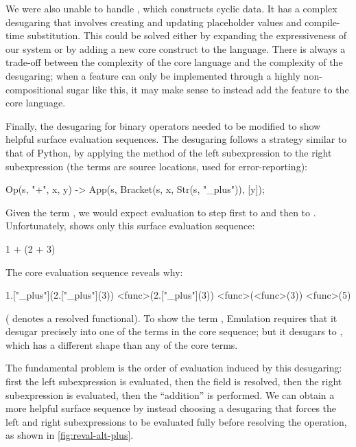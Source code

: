 We were also unable to handle , which constructs cyclic data.
It has a
complex desugaring that involves creating and updating placeholder values
and compile-time substitution. This could be solved either by expanding
the expressiveness of our system or by adding a new core construct to the
language. There is always a trade-off between the complexity of the core
language and the complexity of the desugaring; when a feature can only be
implemented through a highly non-compositional sugar like this, it may
make sense to instead add the feature to the core language.

Finally, the desugaring for binary operators needed to be modified to show helpful
surface evaluation sequences. The desugaring follows
a strategy similar to that of Python, by applying the  method
of the left subexpression to the right subexpression (the  terms
are source locations, used for error-reporting):
\begin{codeex}
  Op(s, "+", x, y)  ->
    App(s, Bracket(s, x, Str(s, "_plus")), [y]);
\end{codeex}
Given the term , we would expect evaluation to step
first to  and then to . Unfortunately, {\Resugarer}
shows only this surface evaluation sequence:
\begin{codeex}
    1 + (2 + 3) 
\end{codeex}
The core evaluation sequence reveals why:
\begin{codeex}
    1.["_plus"](2.["_plus"](3))
\cstep <func>(2.["_plus"](3))
\cstep <func>(<func>(3))
\cstep <func>(5)
\end{codeex}
( denotes a resolved functional). To show the
term , Emulation requires that it desugar
precisely into one of the terms in the core sequence; but it desugars
to , which has a different shape than any of the
core terms.

The fundamental problem is the order of evaluation induced by this
desugaring: first the left subexpression is evaluated, then the
 field is resolved, then the right subexpression is
evaluated, then the ``addition'' is performed. We can obtain a more
helpful surface sequence by instead choosing a desugaring
that forces the left and right subexpressions to be evaluated fully before
resolving the operation, as shown in \cref{fig:reval-alt-plus}.

